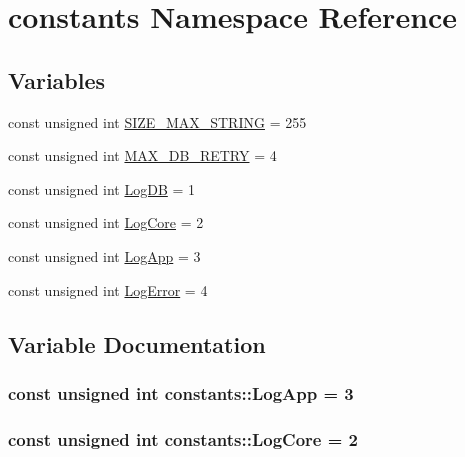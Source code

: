 \hypertarget{namespaceconstants}{}\section{constants Namespace Reference}
\label{namespaceconstants}
\subsection*{Variables}
\begin{DoxyCompactItemize}
\item 
const unsigned int \hyperlink{namespaceconstants_adcd439ae5ec9438dd68ae97ab9197b7d}{S\+I\+Z\+E\+\_\+\+M\+A\+X\+\_\+\+S\+T\+R\+I\+N\+G} = 255
\item 
const unsigned int \hyperlink{namespaceconstants_aeb74a174c09b3270cbbe13cd7096bdc4}{M\+A\+X\+\_\+\+D\+B\+\_\+\+R\+E\+T\+R\+Y} = 4
\item 
const unsigned int \hyperlink{namespaceconstants_a90387be767c7d3ee7855aad5ae30424d}{Log\+D\+B} = 1
\item 
const unsigned int \hyperlink{namespaceconstants_aada35d037abd0a8624988bd14ce6fc92}{Log\+Core} = 2
\item 
const unsigned int \hyperlink{namespaceconstants_afe40c5b2a1c35d5502687c6e68c62872}{Log\+App} = 3
\item 
const unsigned int \hyperlink{namespaceconstants_a37912655c5c028aaac3f43c328cac5a9}{Log\+Error} = 4
\end{DoxyCompactItemize}


\subsection{Variable Documentation}
\hypertarget{namespaceconstants_afe40c5b2a1c35d5502687c6e68c62872}{}
\subsubsection[{Log\+App}]{\setlength{\rightskip}{0pt plus 5cm}const unsigned int constants\+::\+Log\+App = 3}\label{namespaceconstants_afe40c5b2a1c35d5502687c6e68c62872}
\hypertarget{namespaceconstants_aada35d037abd0a8624988bd14ce6fc92}{}
\subsubsection[{Log\+Core}]{\setlength{\rightskip}{0pt plus 5cm}const unsigned int constants\+::\+Log\+Core = 2}\label{namespaceconstants_aada35d037abd0a8624988bd14ce6fc92}
\hypertarget{namespaceconstants_a90387be767c7d3ee7855aad5ae30424d}{}
